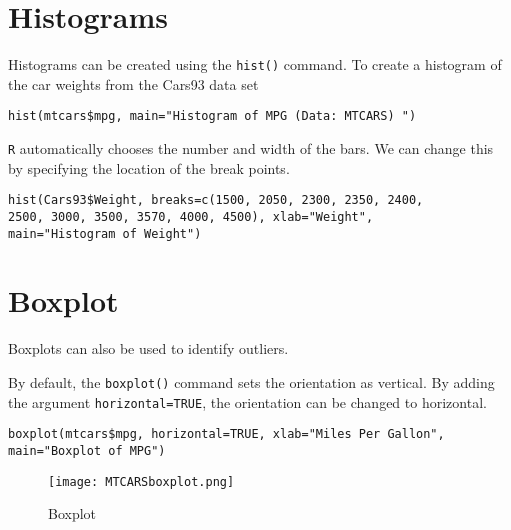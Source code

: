 
\section{Histograms}
Histograms can be created using the \texttt{hist()} command.
To create a histogram of the car weights from the Cars93 data set
\footnotesize
\begin{myindentpar}{1cm}
\begin{verbatim}
hist(mtcars$mpg, main="Histogram of MPG (Data: MTCARS) ")
\end{verbatim}
\end{myindentpar}\normalsize
\texttt{R} automatically chooses the number and width of the bars. We can
change this by specifying the location of the break points.
\footnotesize
\begin{myindentpar}{1cm}
\begin{verbatim}hist(Cars93$Weight, breaks=c(1500, 2050, 2300, 2350, 2400,
2500, 3000, 3500, 3570, 4000, 4500), xlab="Weight",
main="Histogram of Weight")
\end{verbatim}
\end{myindentpar}\normalsize




\section{Boxplot}
Boxplots can also be used to identify outliers.

By default, the \texttt{boxplot()} command sets the orientation as vertical. By adding the argument \texttt{horizontal=TRUE}, the orientation can be changed to horizontal.
\footnotesize
\begin{myindentpar}{1cm}
\begin{verbatim}
boxplot(mtcars$mpg, horizontal=TRUE, xlab="Miles Per Gallon",
main="Boxplot of MPG")
\end{verbatim}
\end{myindentpar}\normalsize

\begin{figure}
  \texttt{[image: MTCARSboxplot.png]}\\
  \caption{Boxplot}\label{boxplot}
\end{figure}




